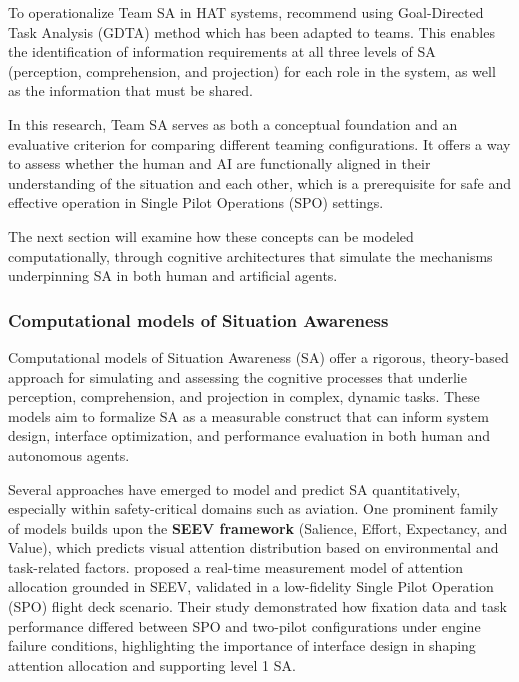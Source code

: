 \documentclass[12pt,a4paper]{article} %
\begin{document}
	To operationalize Team SA in HAT systems, \textcite{endsley_supporting_2023} recommend using Goal-Directed Task Analysis (GDTA) method which has been adapted to teams. This enables the identification of information requirements at all three levels of SA (perception, comprehension, and projection) for each role in the system, as well as the information that must be shared.

	In this research, Team SA serves as both a conceptual foundation and an evaluative criterion for comparing different teaming configurations. It offers a way to assess whether the human and AI are functionally aligned in their understanding of the situation and each other, which is a prerequisite for safe and effective operation in Single Pilot Operations (SPO) settings.

	The next section will examine how these concepts can be modeled computationally, through cognitive architectures that simulate the mechanisms underpinning SA in both human and artificial agents.

	\subsubsection{Computational models of Situation Awareness}

	Computational models of Situation Awareness (SA) offer a rigorous, theory-based approach for simulating and assessing the cognitive processes that underlie perception, comprehension, and projection in complex, dynamic tasks. These models aim to formalize SA as a measurable construct that can inform system design, interface optimization, and performance evaluation in both human and autonomous agents.

	Several approaches have emerged to model and predict SA quantitatively, especially within safety-critical domains such as aviation. One prominent family of models builds upon the \textbf{SEEV framework} (Salience, Effort, Expectancy, and Value), which predicts visual attention distribution based on environmental and task-related factors. \textcite{wang_real-time_2024} proposed a real-time measurement model of attention allocation grounded in SEEV, validated in a low-fidelity Single Pilot Operation (SPO) flight deck scenario. Their study demonstrated how fixation data and task performance differed between SPO and two-pilot configurations under engine failure conditions, highlighting the importance of interface design in shaping attention allocation and supporting level 1 SA.
\end{document}
